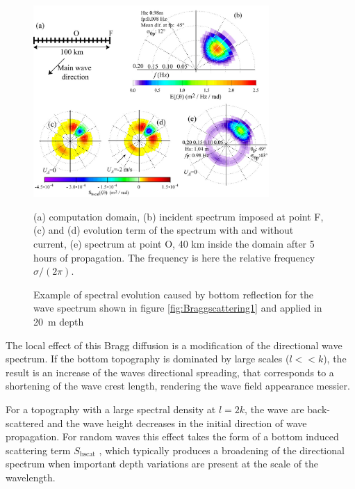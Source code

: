 \begin{figure}[htb]
\centerline{\includegraphics[width=0.8\textwidth]{FIGS_CH_SHALLOWLIN/figure_whitepaper73.jpg}}
  \caption{Example of spectral evolution caused by bottom reflection for the wave spectrum shown in 
  figure \ref{fig:Braggscattering1} and applied in 20~m depth }{(a) computation domain, (b) incident spectrum imposed at point F,
  (c) and (d) evolution term of the spectrum with and without current, (e) spectrum at point O, 40 km inside the domain after
  5 hours of propagation. The frequency is here the relative frequency $\sigma/(2 \pi)$.}\label{fig:Braggscattering2}
\end{figure}

The local effect of this Bragg diffusion is a modification of the
directional wave spectrum. If the bottom topography is dominated
by large scales ($l<< k$), the result is an increase of the waves directional
spreading, that corresponds to a shortening of the wave crest length,
rendering the wave field appearance messier.

For a topography with a large spectral density at $l=2k$, the wave
are back-scattered \citep{Heathershaw1982}
and the wave height decreases in the initial direction of wave 
propagation. For random waves this effect takes the form of 
 a bottom induced scattering term  $S_{\mathrm{bscat}}$ \citep{Ardhuin&Magne2007}, which typically 
 produces a broadening of the directional spectrum when important depth variations are present at the scale 
 of the wavelength.

